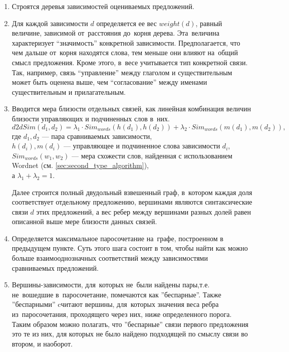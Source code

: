 \begin{enumerate}

\item {
Строятся деревья зависимостей оцениваемых предложений.
}

\item {
Для каждой зависимости $d$ определяется ее  вес $weight(d)$, равный величине,  
зависимой от~расстояния до~корня дерева.
Эта~величина характеризует ``значимость'' конкретной зависимости.
Предполагается, что чем дальше от~корня находятся слова, тем меньше они влияют на~общий смысл предложения. 
Кроме этого, в~весе учитывается тип конкретной связи.
Так, например, связь ``управление'' между глаголом и существительным 
может быть оценена выше, чем ``согласование'' между именами существительным и прилагательным.
}

\item{
Вводится мера близости отдельных связей, как линейная комбинация
величин близости управляющих и подчиненных слов в~них.
$$d2dSim(d_1,d_2) = \lambda_1 \cdot Sim_{words}(h(d_1),h(d_2)) + \lambda_2 \cdot Sim_{words}(m(d_1),m(d_2)), $$
где $d_1, d_2$ --- пара сравниваемых зависимости,\\
$h(d_i), m(d_i)$ --- управляющее и подчиненное слова зависимости $d_i$,\\
$Sim_{words}(w_1,w_2)$ --- мера схожести слов, найденная с использованием Wordnet (см. \ref{sec:second_type_algorithm}),\\
а $\lambda_1 + \lambda_2 = 1$.

Далее строится полный двудольный взвешенный граф, в~котором каждая доля соответствует отдельному предложению,
вершинами являются синтаксические связи $d$ этих предложений,
а вес ребер между вершинами разных долей равен описанной выше мере близости
данных связей.
}

\item {
Определяется максимальное паросочетание на~графе,
построенном в предыдущем пункте.
Суть этого шага состоит в том, чтобы найти как можно
больше взаимооднозначных соответствий между зависимостями
сравниваемых предложений.
}

\item {
Вершины-зависимости, для~которых не~были найдены пары,т.е. не~вошедшие в~паросочетание, 
помечаются как ''беспарные''.
Также ''беспарными'' cчитают вершины,  для~которых значения веса ребра из~паросочетания, 
проходящего через них, ниже определенного порога.
Таким образом можно полагать, что ''беспарные'' связи первого предложения это те из них,
для которых не было найдено подходящей по смыслу связи во втором, и наоборот. 
}


\end{enumerate}
